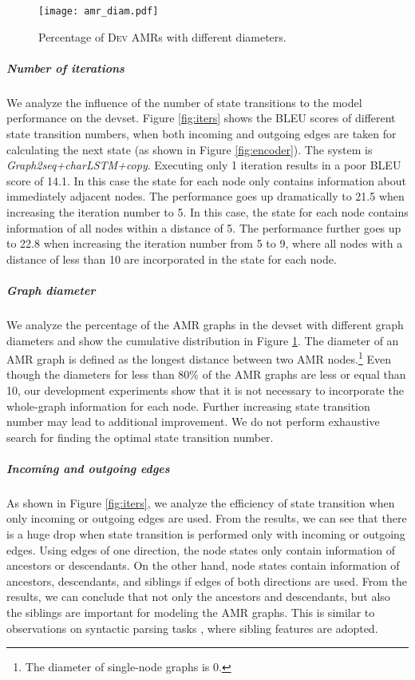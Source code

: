 \documentclass[11pt,a4paper]{article}
\begin{document}
\begin{figure}[t]
\centering
\texttt{[image: amr\_diam.pdf]}
\vspace{-1.0em}
\caption{Percentage of \textsc{Dev} AMRs with different diameters.}
\label{fig:depth}
\vspace{-1.0em}
\end{figure}

\subparagraph{Number of iterations}
We analyze the influence of the number of state transitions to the model performance on the devset.
Figure \ref{fig:iters} shows the BLEU scores of different state transition numbers, when both incoming and outgoing edges are taken for calculating the next state (as shown in Figure \ref{fig:encoder}).
The system is \emph{Graph2seq+charLSTM+copy}.
Executing only 1 iteration results in a poor BLEU score of 14.1.
In this case the state for each node only contains information about immediately adjacent nodes.
The performance goes up dramatically to 21.5 when increasing the iteration number to 5.
In this case, the state for each node contains information of all nodes within a distance of 5.
The performance further goes up to 22.8 when increasing the iteration number from 5 to 9,
where all nodes with a distance of less than 10 are incorporated in the state for each node.


\subparagraph{Graph diameter}
We analyze the percentage of the AMR graphs in the devset with different graph diameters and show the cumulative distribution in Figure \ref{fig:depth}.
The diameter of an AMR graph is defined as the longest distance between two AMR nodes.\footnote{The diameter of single-node graphs is 0.}
Even though the diameters for less than 80\% of the AMR graphs are less or equal than 10, our development experiments show that it is not necessary to incorporate the whole-graph information for each node.
Further increasing state transition number may lead to additional improvement. 
We do not perform exhaustive search for finding the optimal state transition number.


\subparagraph{Incoming and outgoing edges}
As shown in Figure \ref{fig:iters}, we analyze the efficiency of state transition when only incoming or outgoing edges are used.
From the results, we can see that there is a huge drop when state transition is performed only with incoming or outgoing edges.
Using edges of one direction, the node states only contain information of ancestors or descendants.
On the other hand, node states contain information of ancestors, descendants, and siblings if edges of both directions are used.
From the results, we can conclude that not only the ancestors and descendants, but also the siblings are important for modeling the AMR graphs.
This is similar to observations on syntactic parsing tasks \cite{mcdonald-crammer-pereira:2005:ACL}, where sibling features are adopted.
\end{document}
